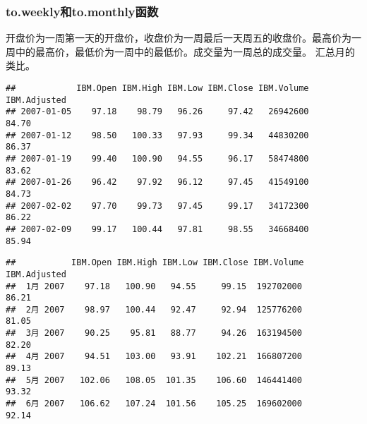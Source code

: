 \subsubsection{to.weekly和to.monthly函数}
开盘价为一周第一天的开盘价，收盘价为一周最后一天周五的收盘价。最高价为一周中的最高价，最低价为一周中的最低价。成交量为一周总的成交量。
汇总月的类比。
\begin{knitrout}
\color{fgcolor}\begin{kframe}
\begin{alltt}
\hlstd{(}
\end{alltt}
\begin{verbatim}
##            IBM.Open IBM.High IBM.Low IBM.Close IBM.Volume IBM.Adjusted
## 2007-01-05    97.18    98.79   96.26     97.42   26942600        84.70
## 2007-01-12    98.50   100.33   97.93     99.34   44830200        86.37
## 2007-01-19    99.40   100.90   94.55     96.17   58474800        83.62
## 2007-01-26    96.42    97.92   96.12     97.45   41549100        84.73
## 2007-02-02    97.70    99.73   97.45     99.17   34172300        86.22
## 2007-02-09    99.17   100.44   97.81     98.55   34668400        85.94
\end{verbatim}
\begin{alltt}
\hlstd{(}
\end{alltt}


{\ttfamily\noindent\color{warningcolor}{\#\# Warning: timezone of object (UTC) is different than current timezone ().}}\begin{verbatim}
##           IBM.Open IBM.High IBM.Low IBM.Close IBM.Volume IBM.Adjusted
##  1月 2007    97.18   100.90   94.55     99.15  192702000        86.21
##  2月 2007    98.97   100.44   92.47     92.94  125776200        81.05
##  3月 2007    90.25    95.81   88.77     94.26  163194500        82.20
##  4月 2007    94.51   103.00   93.91    102.21  166807200        89.13
##  5月 2007   102.06   108.05  101.35    106.60  146441400        93.32
##  6月 2007   106.62   107.24  101.56    105.25  169602000        92.14
\end{verbatim}
\end{kframe}
\end{knitrout}
